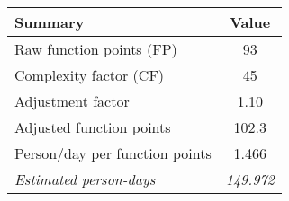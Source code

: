\begin{tabular}{l|c}
\textbf{Summary} & \textbf{Value} \\ \hline
Raw function points (FP) & 93 \\
Complexity factor (CF) & 45 \\
Adjustment factor & 1.10 \\
Adjusted function points & 102.3 \\
Person/day per function points & 1.466 \\ \hline
\textit{Estimated person-days} & \textit{149.972}
\end{tabular}
